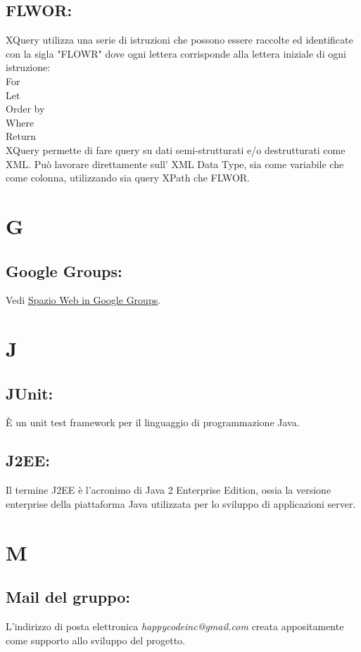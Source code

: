 \section{FLWOR:}
XQuery utilizza una serie di istruzioni che possono essere raccolte ed identificate con la sigla "FLOWR" dove ogni lettera corrisponde alla lettera iniziale di ogni istruzione:\\
For \\
Let \\
Order by \\
Where \\
Return \\
XQuery permette di fare query su dati semi-strutturati e/o destrutturati come XML. Pu\`o lavorare direttamente sull' XML Data Type, sia come variabile che come colonna, utilizzando sia query XPath che FLWOR.

\chapter{G}
\hypertarget{Google Groups}{}
\section{Google Groups:}
Vedi \hyperlink{Spazio Web in Google Groups}{Spazio Web in Google Groups}.

\chapter{J}
\section{JUnit:}
\`E un unit test framework per il linguaggio di programmazione Java.
\hypertarget{J2EE}{}
\section{J2EE:}
Il termine J2EE \`e l'acronimo di Java 2 Enterprise Edition, ossia la versione enterprise della piattaforma Java utilizzata per lo sviluppo di applicazioni server.

\chapter{M}
\section{Mail del gruppo:}
L'indirizzo di posta elettronica \textit{happycodeinc@gmail.com} creata appositamente come supporto allo sviluppo del progetto.
